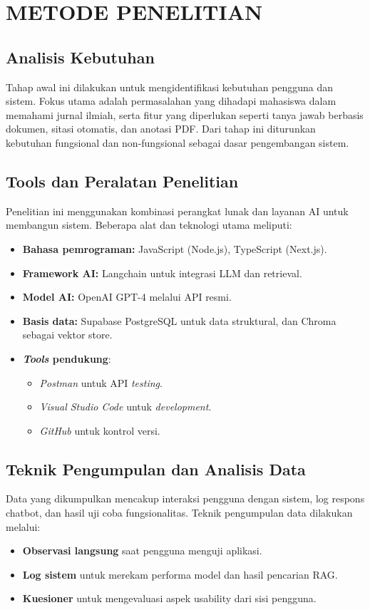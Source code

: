 \chapter{METODE PENELITIAN}


\section{Analisis Kebutuhan}
Tahap awal ini dilakukan untuk mengidentifikasi kebutuhan pengguna dan sistem. Fokus utama adalah permasalahan yang dihadapi mahasiswa dalam memahami jurnal ilmiah, serta fitur yang diperlukan seperti tanya jawab berbasis dokumen, sitasi otomatis, dan anotasi PDF. Dari tahap ini diturunkan kebutuhan fungsional dan non-fungsional sebagai dasar pengembangan sistem.

\section{Tools dan Peralatan Penelitian}
Penelitian ini menggunakan kombinasi perangkat lunak dan layanan AI untuk membangun sistem. Beberapa alat dan teknologi utama meliputi:
\begin{itemize}
  \item \textbf{Bahasa pemrograman:} JavaScript (Node.js), TypeScript (Next.js).
  \item \textbf{Framework AI:} Langchain untuk integrasi LLM dan retrieval.
  \item \textbf{Model AI:} OpenAI GPT-4 melalui API resmi.
  \item \textbf{Basis data:} Supabase PostgreSQL untuk data struktural, dan Chroma sebagai vektor store.
  \item \textbf{\emph{Tools} pendukung}:
        \begin{itemize}
          \item \emph{Postman} untuk API \emph{testing}.
          \item \emph{Visual Studio Code} untuk \emph{development}.
          \item \emph{GitHub} untuk kontrol versi.
        \end{itemize}
\end{itemize}




\section{Teknik Pengumpulan dan Analisis Data}
Data yang dikumpulkan mencakup interaksi pengguna dengan sistem, log respons chatbot, dan hasil uji coba fungsionalitas. Teknik pengumpulan data dilakukan melalui:
\begin{itemize}
  \item \textbf{Observasi langsung} saat pengguna menguji aplikasi.
  \item \textbf{Log sistem} untuk merekam performa model dan hasil pencarian RAG.
  \item \textbf{Kuesioner} untuk mengevaluasi aspek usability dari sisi pengguna.
\end{itemize}

